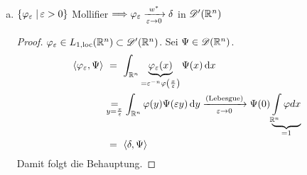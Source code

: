 \begin{bsp}
\begin{enumerate}[(a)]
  \item $\{\varphi_\varepsilon\;\vert\,\varepsilon>0\}$ Mollifier $\Longrightarrow\varphi_\varepsilon\xrightarrow[\varepsilon\rightarrow0]{w^*}\delta$ in $\mathscr{D}'(\mathbb{R}^n)$
    \begin{proof}
      $\varphi_\varepsilon\in L_{1,\scriptsize{\textnormal{loc}}}(\mathbb{R}^n)\subset\mathscr{D}'(\mathbb{R}^n)$. Sei $\Psi\in\mathscr{D}(\mathbb{R}^n)$.
      \begin{align*}
        \langle\varphi_\varepsilon,\Psi\rangle &\ = \
        \int_{\mathbb{R}^n}\underbrace{\varphi_\varepsilon(x)}
        _{=\varepsilon^{-n}\varphi\left(\frac x{\varepsilon}\right)}
        \Psi(x)\,\mathrm{d} x \\
        &\underset{y=\frac x{\varepsilon}}
        =\int_{\mathbb{R}^n}\varphi(y)\Psi(\varepsilon y)\,\mathrm{d} y
        \xrightarrow[\varepsilon\rightarrow0]{\scriptsize\text{(Lebesgue)}}
        \Psi(0)\underbrace{\int\limits_{\mathbb{R}^n}\varphi dx}_{=1} \\
        &\ =\ \langle\delta,\Psi\rangle
      \end{align*}
      Damit folgt die Behauptung.
    \end{proof}
  \end{enumerate}
\end{bsp}

